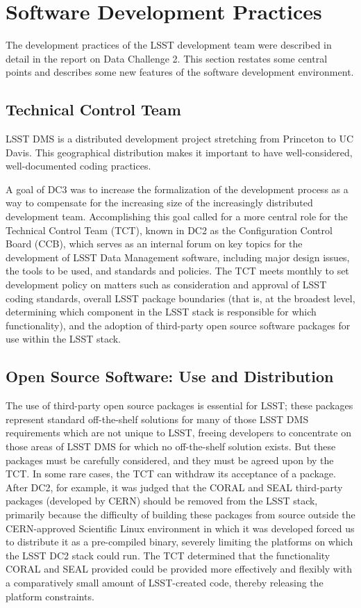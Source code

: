 
\section{Software Development Practices}

The development practices of the LSST development team were described in detail
in the report on Data Challenge 2. This section restates some central points and
describes some new features of the software development environment.

\subsection{Technical Control Team}

LSST DMS is a distributed development project stretching from Princeton to UC
Davis. This geographical distribution makes it important to have
well-considered, well-documented coding practices.

A goal of DC3 was to increase the formalization of the development process as a
way to compensate for the increasing size of the increasingly distributed
development team. Accomplishing this goal called for a more central role for the
Technical Control Team (TCT), known in DC2 as the Configuration Control Board
(CCB), which serves as an internal forum on key topics for the development of
LSST Data Management software, including major design issues, the tools to be
used, and standards and policies. The TCT meets monthly to set development
policy on matters such as consideration and approval of LSST coding standards,
overall LSST package boundaries (that is, at the broadest level, determining
which component in the LSST stack is responsible for which functionality), and
the adoption of third-party open source software packages for use within the
LSST stack.

\subsection{Open Source Software: Use and Distribution}

The use of third-party open source packages is essential for LSST; these
packages represent standard off-the-shelf solutions for many of those LSST DMS
requirements which are not unique to LSST, freeing developers to concentrate on
those areas of LSST DMS for which no off-the-shelf solution exists. But these
packages must be carefully considered, and they must be agreed upon by the TCT.
In some rare cases, the TCT can withdraw its acceptance of a package. After DC2,
for example, it was judged that the CORAL and SEAL third-party packages
(developed by CERN) should be removed from the LSST stack, primarily because the
difficulty of building these packages from source outside the CERN-approved
Scientific Linux environment in which it was developed forced us to distribute
it as a pre-compiled binary, severely limiting the platforms on which the LSST
DC2 stack could run. The TCT determined that the functionality CORAL and SEAL
provided could be provided more effectively and flexibly with a comparatively
small amount of LSST-created code, thereby releasing the platform constraints.

